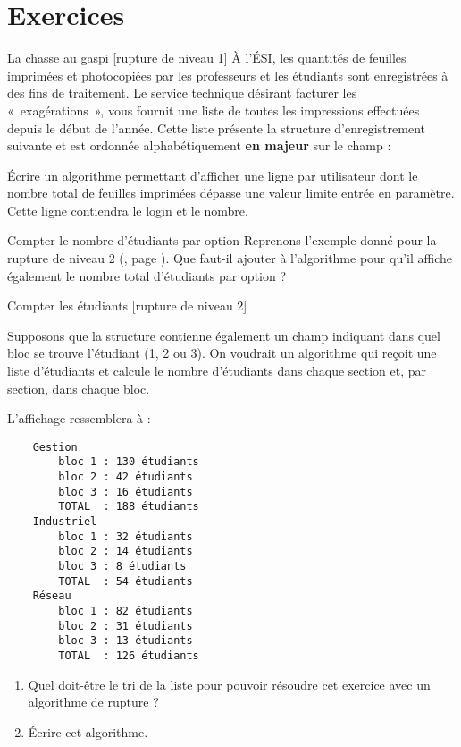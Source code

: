 \section{Exercices}


\begin{Exercice}{La chasse au gaspi [rupture de niveau 1]}
	À l’ÉSI, les quantités de feuilles imprimées et photocopiées 
	par les professeurs et les étudiants sont enregistrées à des fins de traitement.
	Le service technique désirant facturer les «~exagérations~», 
	vous fournit une liste de toutes les impressions effectuées depuis le début de l'année.
	Cette liste présente la structure d’enregistrement  suivante 
	et est ordonnée alphabétiquement \textbf{en majeur} sur le champ   :

	\begin{LDA}
		\EndStruct
	\end{LDA}

	Écrire un algorithme permettant d'afficher une ligne par
	utilisateur dont le nombre total de feuilles imprimées dépasse une
	valeur limite entrée en paramètre. 
	Cette ligne contiendra le login et le nombre.
\end{Exercice}

\begin{Exercice}{Compter le nombre d'étudiants par option}
	Reprenons l'exemple donné pour la rupture de niveau 2 (, page \pageref{algo:rupt2}).
	Que faut-il ajouter à l'algorithme pour qu'il affiche également 
	le nombre total d'étudiants par option ?
\end{Exercice}

\begin{Exercice}{Compter les étudiants [rupture de niveau 2]}
	
	Supposons que la structure  contienne également
	un champ indiquant dans quel bloc se trouve l'étudiant (1, 2 ou 3).
	On voudrait un algorithme qui reçoit une liste d'étudiants et calcule
	le nombre d'étudiants dans chaque section et, par section, dans chaque bloc.
	
	L'affichage ressemblera à :
	{\small
	\begin{verbatim}
    Gestion
        bloc 1 : 130 étudiants
        bloc 2 : 42 étudiants
        bloc 3 : 16 étudiants
        TOTAL  : 188 étudiants
    Industriel
        bloc 1 : 32 étudiants
        bloc 2 : 14 étudiants
        bloc 3 : 8 étudiants
        TOTAL  : 54 étudiants
    Réseau
        bloc 1 : 82 étudiants
        bloc 2 : 31 étudiants
        bloc 3 : 13 étudiants
        TOTAL  : 126 étudiants
	\end{verbatim}
	}
	\begin{enumerate}[label=\alph*)]
		\item 
		Quel doit-être le tri de la liste pour pouvoir résoudre cet exercice
		avec un algorithme de rupture ?
		\item 
		Écrire cet algorithme.
	\end{enumerate}
\end{Exercice}
	
